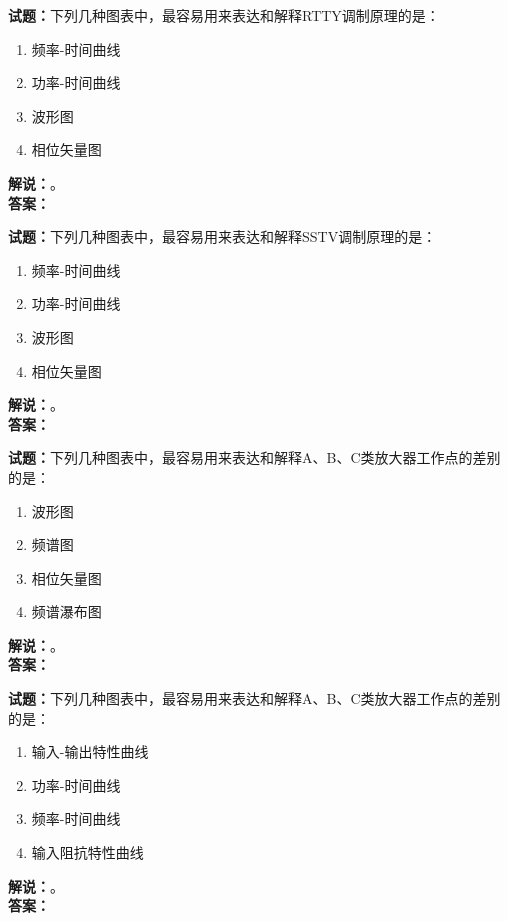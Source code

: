 \documentclass{ctexbook}
\begin{document}
\bigskip

\noindent\textbf{试题：}下列几种图表中，最容易用来表达和解释RTTY调制原理的是：
\begin{enumerate}[leftmargin=3em]
  \item 频率-时间曲线
  \item 功率-时间曲线
  \item 波形图
  \item 相位矢量图
\end{enumerate}
\noindent\textbf{解说：}\textbf{}。\\\noindent\textbf{答案：}

\bigskip

\noindent\textbf{试题：}下列几种图表中，最容易用来表达和解释SSTV调制原理的是：
\begin{enumerate}[leftmargin=3em]
  \item 频率-时间曲线
  \item 功率-时间曲线
  \item 波形图
  \item 相位矢量图
\end{enumerate}
\noindent\textbf{解说：}\textbf{}。\\\noindent\textbf{答案：}

\bigskip

\noindent\textbf{试题：}下列几种图表中，最容易用来表达和解释A、B、C类放大器工作点的差别的是：
\begin{enumerate}[leftmargin=3em]
  \item 波形图
  \item 频谱图
  \item 相位矢量图
  \item 频谱瀑布图
\end{enumerate}
\noindent\textbf{解说：}\textbf{}。\\\noindent\textbf{答案：}

\bigskip

\noindent\textbf{试题：}下列几种图表中，最容易用来表达和解释A、B、C类放大器工作点的差别的是：
\begin{enumerate}[leftmargin=3em]
  \item 输入-输出特性曲线
  \item 功率-时间曲线
  \item 频率-时间曲线
  \item 输入阻抗特性曲线
\end{enumerate}
\noindent\textbf{解说：}\textbf{}。\\\noindent\textbf{答案：}

\bigskip
\end{document}
